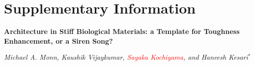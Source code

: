 \documentclass[12pt,onecolumn]{article}
\begin{document}



\doublespacing
\clearpage
\pagebreak
\onecolumn

\setcounter{page}{1}

\setcounter{section}{0}
\renewcommand{\thesection}{S\arabic{section}}

\setcounter{equation}{0}
\renewcommand{\theequation}{S\arabic{equation}}

\setcounter{figure}{0}
\renewcommand{\thefigure}{S\arabic{figure}}
\setcounter{table}{0}
\renewcommand{\thetable}{S\arabic{table}}

\part*{Supplementary Information}

\textbf{Architecture in Stiff Biological Materials: a Template for Toughness Enhancement, or a Siren Song?}

\textit{Michael A. Monn, Kaushik Vijaykumar, \textcolor{red}{Sayaka Kochiyama}, and Haneesh Kesari$^*$}
\end{document}
